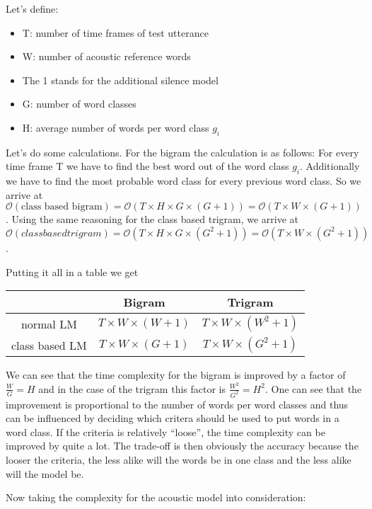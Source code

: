 Let's define: 

\begin{itemize}
	\item T: number of time frames of test utterance
	\item W: number of acoustic reference words
	\item The 1 stands for the additional silence model
	\item G: number of word classes 
	\item H: average number of words per word class $g_i$
\end{itemize}

Let's do some calculations. For the bigram the calculation is as follows:
For every time frame T we have to find the best word out of the word class $g_i$. 
Additionally we have to find the most probable word class for every previous word class. 
So we arrive at $\mathcal{O}(\text{class based bigram}) = \mathcal{O}(T \times H \times G \times (G + 1)) = \mathcal{O}(T \times W \times (G+1))$ .
Using the same reasoning for the class based trigram, we arrive at $\mathcal{O}(class based trigram) = \mathcal{O}(T \times H \times G \times (G^2 + 1)) = \mathcal{O}(T \times W \times (G^2 + 1))$.

Putting it all in a table we get

\begin{center}
\begin{tabular}{ c | c | c }
  & Bigram & Trigram \\ 
 \hline
 normal LM & $T \times W \times (W + 1)$ & $T \times W \times (W^2 + 1)$ \\  
 class based LM & $T \times W \times (G + 1)$ & $T \times W \times (G^2 + 1)$    
\end{tabular}
\end{center} 

We can see that the time complexity for the bigram is improved by a factor of $\frac{W}{G} = H$ and in the case of the trigram 
this factor is $\frac{W^2}{G^2} = H^2$. One can see that the improvement is proportional to the number of words per word classes and 
thus can be influenced by deciding which critera should be used to put words in a word class. If the criteria is relatively ``loose'',
the time complexity can be improved by quite a lot. The trade-off is then obviously the accuracy because the looser the criteria, the less alike 
will the words be in one class and the less alike will the model be.

Now taking the complexity for the acoustic model into consideration: 

